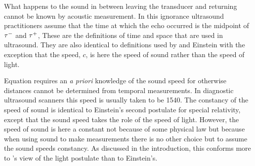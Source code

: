 What happens to the sound in between leaving the transducer and returning
cannot be known by acoustic measurement.
In this ignorance ultrasound practitioners assume that the time at which the echo 
occurred is the midpoint of $\tau^-$ and $\tau^+$,
These are the definitions of time and space that are used in ultrasound.
They are also identical to definitions used by \Poincare\cite{Poincare1908, Pierseaux2005} and Einstein\cite{Einstein1905,Dolby2001}
with the exception that the speed, $c$, is here the speed of sound rather than the speed of light.


Equation  requires an {\em a priori} knowledge of the sound speed
for otherwise distances cannot be determined from temporal measurements.
In diagnostic ultrasound scanners this speed is usually taken to be \unit{1540}\metre\reciprocal\second.
The constancy of the speed of sound is identical to Einstein's  second postulate for special relativity\cite{Einstein1905},
except that the sound speed takes the role of the speed of light.
However, the speed of sound is here a constant not because of some physical law
but because when using sound to make measurements 
there is no other choice  but to assume the sound speeds constancy. %
As discussed in the introduction, this conforms more to \Poincare's view of the light postulate than to Einstein's.


